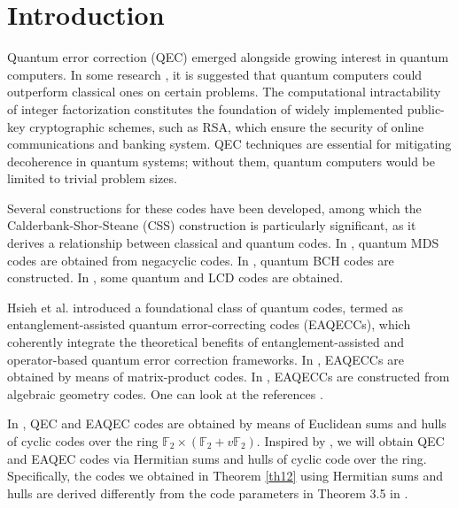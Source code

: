 \documentclass[pdflatex,sn-mathphys-num]{sn-jnl}%
\theoremstyle{thmstyleone}%
\theoremstyle{thmstyletwo}%
\theoremstyle{thmstylethree}%
\begin{document}
\section{Introduction}\label{sec1}

Quantum error correction (QEC) emerged alongside growing interest in quantum computers. In some research \cite{benioff1980computer,deutsch1985quantum,feynman2018simulating,simon1997power,yao1993quantum}, it is suggested that quantum computers could outperform classical ones on certain problems. The computational intractability of integer factorization constitutes the foundation of widely implemented public-key cryptographic schemes, such as RSA, which ensure the security of online communications and banking system. QEC techniques are essential for mitigating decoherence in quantum systems; without them, quantum computers would be limited to trivial problem sizes.

Several constructions for these codes have been developed, among which the Calderbank-Shor-Steane (CSS) construction \cite{calderbank1997quantum,steane1996multiple} is particularly significant, as it derives a relationship between classical and quantum codes. In \cite{kai2012new}, quantum MDS codes are obtained from negacyclic codes. In \cite{grassl1999quantum}, quantum BCH codes are constructed. In \cite{ashraf2021new}, some quantum and LCD codes are obtained.

Hsieh et al. \cite{hsieh2007general} introduced a foundational class of quantum codes, termed as entanglement-assisted quantum error-correcting codes (EAQECCs), which coherently integrate the theoretical benefits of entanglement-assisted and operator-based quantum error correction frameworks. In \cite{cao2025entanglement}, EAQECCs are obtained by means of matrix-product codes. In \cite{pereira2021entanglement}, EAQECCs are constructed from algebraic geometry codes. One can look at the references \cite{li2025eaqec,koroglu2019new,pang2021new,sari2021new,chen2018entanglement,li2019entanglement,pereira2022entanglement,sok2022linear}.

In \cite{euclideansum}, QEC and EAQEC codes are obtained by means of Euclidean sums and hulls of cyclic codes over the ring $\mathbb{F}_2\times(\mathbb{F}_2+v\mathbb{F}_2)$. Inspired by \cite{euclideansum}, we will obtain QEC and EAQEC codes via Hermitian sums and hulls of cyclic code over the ring. Specifically, the codes we obtained in Theorem \ref{th12} using Hermitian sums and hulls are derived differently from the code parameters in Theorem 3.5 in \cite{euclideansum}.
\end{document}

